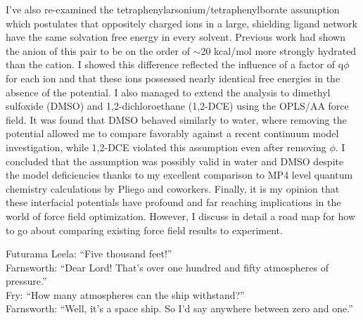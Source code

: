 \begin{tatb}
  I've also re-examined the tetraphenylarsonium/tetraphenylborate assumption which postulates that oppositely charged ions in a large, shielding ligand network have 
  the same solvation free energy in every solvent. Previous work had shown the anion of this pair to be on the order of $\sim$20 kcal/mol more strongly hydrated than
  the cation. I showed this difference reflected the influence of a factor of q$\phi$ for each ion and that these ions possessed nearly identical free
  energies in the absence of the potential. I also managed to extend the analysis to dimethyl sulfoxide (DMSO) and 1,2-dichloroethane (1,2-DCE) using the OPLS/AA 
  force field. It was found that DMSO behaved similarly to water, where removing the potential allowed me to compare favorably against a recent continuum model
  investigation, while 1,2-DCE violated this assumption even after removing $\phi$. I concluded that the assumption was possibly valid in water and DMSO
  despite the model deficiencies thanks to my excellent comparison to MP4 level quantum chemistry calculations by Pliego and coworkers. Finally, it is my opinion 
  that these interfacial potentials have profound and far reaching implications in the world of force field optimization. However, I discuss in detail a road map 
  for how to go about comparing existing force field results to experiment.
  
  \vspace{12 pt}
  
  \begin{wbepi}{Futurama}
   Leela: ``Five thousand feet!'' \\
   Farnsworth: ``Dear Lord! That's over one hundred and fifty atmospheres of pressure.'' \\
   Fry: ``How many atmospheres can the ship withstand?'' \\
   Farnsworth: ``Well, it's a space ship. So I'd say anywhere between zero and one.''
  \end{wbepi}

\end{tatb}